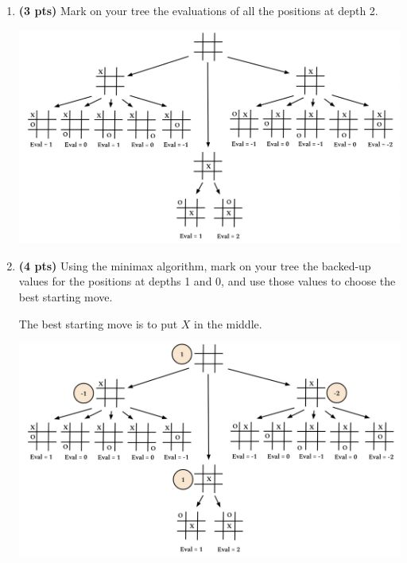 \documentclass{article}
\begin{document}
\begin{enumerate}
\begin{enumerate}[label=($\alph*$)]

    
    \item \textbf{(3 pts)} Mark on your tree the evaluations of all the positions at depth 2.

    \includegraphics[scale=0.5]{472-PS4-Q2-C.png}


    
    \item \textbf{(4 pts)} Using the minimax algorithm, mark on your tree the backed-up values for the positions at depths 1 and 0, and use those values to choose the best starting move.

    \color{blue}
        The best starting move is to put $X$ in the middle.
    \color{black}

    \includegraphics[scale=0.5]{472-PS4-Q2-D.png}


\end{enumerate}
\end{enumerate}
\end{document}
